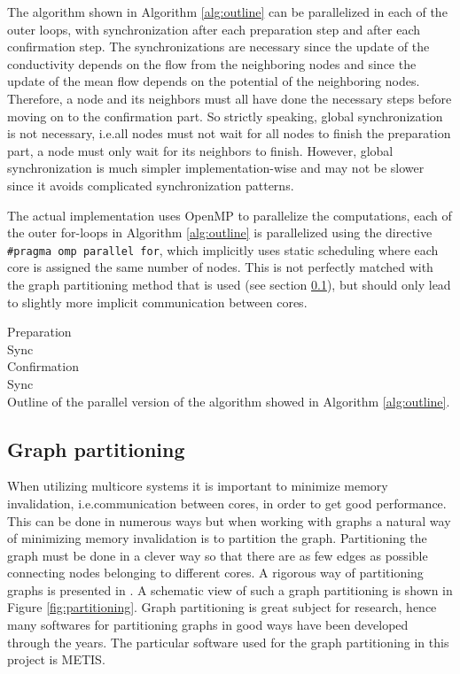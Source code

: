 The algorithm shown in Algorithm \ref{alg:outline} can be parallelized in each of the outer loops, with synchronization after each preparation step and after each confirmation step. The synchronizations are necessary since the update of the conductivity depends on the flow from the neighboring nodes and since the update of the mean flow depends on the potential of the neighboring nodes. Therefore, a node and its neighbors must all have done the necessary steps before moving on to the confirmation part. So strictly speaking, global synchronization is not necessary, i.e.\@ all nodes must not wait for all nodes to finish the preparation part, a node must only wait for its neighbors to finish. However, global synchronization is much simpler implementation-wise and may not be slower since it avoids complicated synchronization patterns.

The actual implementation uses OpenMP to parallelize the computations, each of the outer for-loops in Algorithm \ref{alg:outline} is parallelized using the directive \texttt{\#pragma omp parallel for}, which implicitly uses static scheduling where each core is assigned the same number of nodes. This is not perfectly matched with the graph partitioning method that is used (see section \ref{sec:graph_part}), but should only lead to slightly more implicit communication between cores.

{
\vspace{1em}
\begin{algorithm}[H]
Preparation\\
Sync\\
Confirmation\\
Sync\\
\caption{Outline of the parallel version of the algorithm showed in Algorithm \ref{alg:outline}.}
\label{alg:parallel}
\end{algorithm}
\vspace{1em}
}

\subsection{Graph partitioning}
\label{sec:graph_part}
When utilizing multicore systems it is important to minimize memory invalidation, i.e.\@ communication between cores, in order to get good performance. This can be done in numerous ways but when working with graphs a natural way of minimizing memory invalidation is to partition the graph. Partitioning the graph must be done in a clever way so that there are as few edges as possible connecting nodes belonging to different cores. A rigorous way of partitioning graphs is presented in \cite{Lasalle}. A schematic view of such a graph partitioning is shown in Figure \ref{fig:partitioning}. Graph partitioning is great subject for research, hence many softwares for partitioning graphs in good ways have been developed through the years. The particular software used for the graph partitioning in this project is METIS. 

